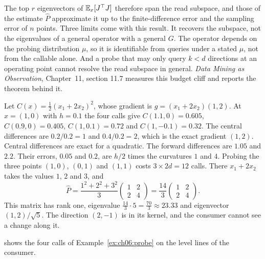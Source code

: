The top $r$ eigenvectors of $\mathbb{E}_x[J^{\top} J]$ therefore span the read subspace, and those of the estimate $\hat P$ approximate it up to the finite-difference error and the sampling error of $n$ points. Three limits come with this result. It recovers the subspace, not the eigenvalues of a general operator with a general $G$. The operator depends on the probing distribution $\mu$, so it is identifiable from queries under a stated $\mu$, not from the callable alone. And a probe that may only query $k<d$ directions at an operating point cannot resolve the read subspace in general. \emph{Data Mining as Observation}, Chapter~11, section 11.7 measures this budget cliff and reports the theorem behind it.

\begin{example}\label{ex:ch06:probe}
Let $C(x)=\tfrac12(x_1+2x_2)^2$, whose gradient is $g=(x_1+2x_2)(1,2)$. At $x=(1,0)$ with $h=0.1$ the four calls give $C(1.1,0)=0.605$, $C(0.9,0)=0.405$, $C(1,0.1)=0.72$ and $C(1,-0.1)=0.32$. The central differences are $0.2/0.2=1$ and $0.4/0.2=2$, which is the exact gradient $(1,2)$. Central differences are exact for a quadratic. The forward differences are $1.05$ and $2.2$. Their errors, $0.05$ and $0.2$, are $h/2$ times the curvatures $1$ and $4$. Probing the three points $(1,0)$, $(0,1)$ and $(1,1)$ costs $3\times 2d=12$ calls. There $x_1+2x_2$ takes the values $1$, $2$ and $3$, and
\[
\hat P=\frac{1^2+2^2+3^2}{3}\begin{pmatrix}1&2\\2&4\end{pmatrix}=\frac{14}{3}\begin{pmatrix}1&2\\2&4\end{pmatrix}.
\]
This matrix has rank one, eigenvalue $\tfrac{14}{3}\cdot 5=\tfrac{70}{3}\approx 23.33$ and eigenvector $(1,2)/\sqrt5$. The direction $(2,-1)$ is in its kernel, and the consumer cannot see a change along it.
\end{example}

 shows the four calls of Example~\ref{ex:ch06:probe} on the level lines of the consumer.

